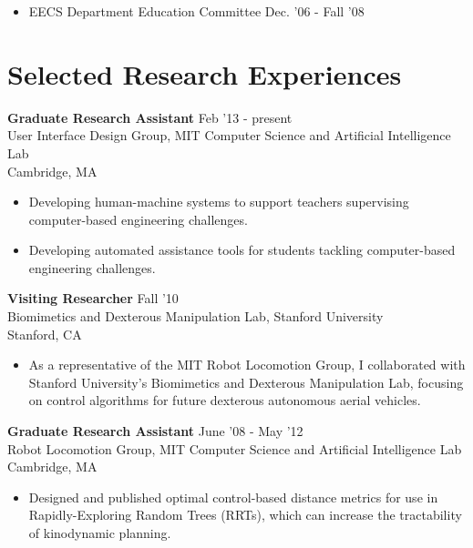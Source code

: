 \documentclass[margin]{res}
\begin{document}
\begin{resume}
\begin{itemize}
               \item  EECS Department Education Committee \hfill Dec. '06 - Fall '08
 \end{itemize}
		 


          

		
		 

\section{Selected Research Experiences}

 {\bf Graduate Research Assistant} \hfill Feb '13 - present \\ User Interface Design Group, MIT Computer Science and Artificial Intelligence Lab \\ Cambridge, MA 
 \begin{itemize} \itemsep -2pt  %
\item Developing human-machine systems to support teachers supervising computer-based engineering challenges. %
\item Developing automated assistance tools for students tackling computer-based engineering challenges.
 \end{itemize}

 {\bf Visiting Researcher} \hfill Fall '10 \\Biomimetics and Dexterous Manipulation Lab, Stanford University  \\ Stanford, CA 
 \begin{itemize} \itemsep -2pt  %
\item As a representative of the MIT Robot Locomotion Group, I collaborated with Stanford University's Biomimetics and Dexterous Manipulation Lab, focusing on control algorithms for future dexterous autonomous aerial vehicles.
 \end{itemize}

 {\bf Graduate Research Assistant} \hfill June '08 - May '12 \\ Robot Locomotion Group, MIT Computer Science and Artificial Intelligence Lab \\ Cambridge, MA 
 \begin{itemize} \itemsep -2pt  %
 \item Designed and published optimal control-based distance metrics for use in Rapidly-Exploring Random Trees (RRTs), which can increase the tractability of kinodynamic planning.
 \end{itemize}
 

\end{resume}
\end{document}
